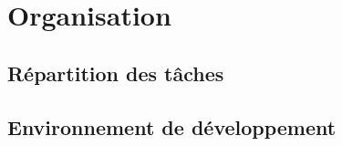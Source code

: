 \section{Organisation}

\subsection{Répartition des tâches}

\subsection{Environnement de développement}


